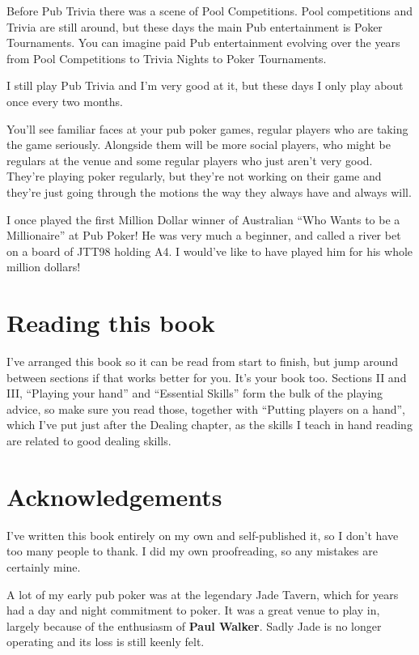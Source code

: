 Before Pub Trivia there was a scene of Pool Competitions. Pool competitions
and Trivia are still around, but these days the main Pub entertainment
is Poker Tournaments. You can imagine paid Pub entertainment evolving
over the years from Pool Competitions to Trivia Nights to Poker Tournaments.

I still play Pub Trivia and I'm very good at it, but these days
I only play about once every two months.

You'll see familiar faces at your pub poker games,
regular players who are taking the game seriously. Alongside them
will be more social players, who might be regulars at the venue
and some regular players who just aren't very good. They're playing
poker regularly, but they're not working on their game and they're
just going through the motions the way they always have and always
will.

I once played the first Million Dollar winner of Australian ``Who Wants to
be a Millionaire'' at Pub Poker! He was very much a beginner, and called
a river bet on a board of JTT98 holding A4. I would've like to have played
him for his whole million dollars!

\section*{Reading this book}

I've arranged this book so it can be read from start to finish, but jump
around between sections if that works better for you. It's your book too.
Sections II and III, ``Playing your hand'' and ``Essential Skills'' form
the bulk of the playing advice, so make sure you read those, together
with ``Putting players on a hand'', which I've put just after the
Dealing chapter, as the skills I teach in hand reading are related
to good dealing skills.

\section*{Acknowledgements}

I've written this book entirely on my own and self-published it, so I don't
have too many people to thank. I did my own proofreading, so any mistakes
are certainly mine.

A lot of my early pub poker was at the legendary Jade Tavern,
which for years had a day and night commitment to poker.
It was a great venue to play in, largely because of the enthusiasm
of \textbf{Paul Walker}. Sadly Jade is no longer operating and
its loss is still keenly felt.

